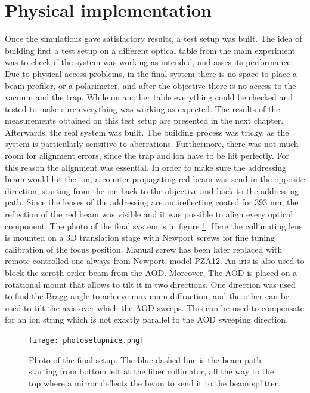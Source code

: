 \section{Physical implementation}
\label{design4}
Once the simulations gave satisfactory results, a test setup was built. The idea of building first a test setup on a different optical table from the main experiment was to check if the system was working as intended, and asses its performance. Due to physical access problems, in the final system there is no space to place a beam profiler, or a polarimeter, and after the objective there is no access to the vacuum and the trap. While on another table everything could be checked and tested to make sure everything was working as expected. The results of the measurements obtained on this test setup are presented in the next chapter.\\
Afterwards, the real system was built. The building process was tricky, as the system is particularly sensitive to aberrations. Furthermore, there was not much room for alignment errors, since the trap and ion have to be hit perfectly. For this reason the alignment was essential. In order to make sure the addressing beam would hit the ion, a counter propagating red beam was send in the opposite direction, starting from the ion back to the objective and back to the addressing path. Since the lenses of the addressing are antireflecting coated for 393 nm, the reflection of the red beam was visible and it was possible to align every optical component. The photo of the final system is in figure \ref{photosetup}. Here the collimating lens is mounted on a 3D translation stage with Newport screws for fine tuning calibration of the focus position. Manual screw has been later replaced with remote controlled one always from Newport, model PZA12. An iris is also used to block the zeroth order beam from the AOD. Moreover, The AOD is placed on a rotational mount that allows to tilt it in two directions. One direction was used to find the Bragg angle to achieve maximum diffraction, and the other can be used to tilt the axis over which the AOD sweeps. This can be used to compensate for an ion string which is not exactly parallel to the AOD sweeping direction.

\begin{figure}[H]
\centering
\texttt{[image: photosetupnice.png]}
\caption{Photo of the final setup. The blue dashed line is the beam path starting from bottom left at the fiber collimator, all the way to the top where a mirror deflects the beam to send it to the beam splitter.}
\label{photosetup}
\end{figure}
